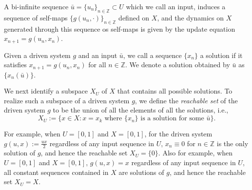 \documentclass[12 pt]{article}
\begin{document}
A bi-infinite sequence $\bar{u}=\{u_n\}_{n \in \mathbb{Z}} \subset U$ which we call an input, induces a sequence of self-maps $\{g(u_n,\cdot)\}_{n\in \mathbb{Z}}$ defined on $X$, and  the dynamics on $X$ generated through this sequence os self-maps is given by the  update equation $x_{n+1}=g(u_n,x_n)$. 


Given a driven system $g$ and an input $\bar{u}$, we call a sequence $\{x_n\}$ a solution if it satisfies  $x_{n+1}=g(u_n,x_n)$ for all $n\in \mathbb{Z}$. We denote a solution obtained by $\bar{u}$ as $\{x_n(\bar{u})\}$.

We next identify a subspace $X_U$ of $X$ that contains all possible solutions. To realize such a subspace of a driven system $g$, we define 
the \textit{reachable set} of the driven system $g$ to be the union of all the elements of all the solutions, i.e., 
$$X_U :=\Big \{x \in X:  x = x_k \mbox{ where  $\{x_n\}$  is a solution for some  $\bar{u}$} \Big \}.$$




For example, when $U=[0,1]$ and $X=[0,1]$, for the driven system 
$g(u,x) := \frac{ux}{2}$ regardless of any input sequence in $U$, $x_n\equiv 0$ for $n \in \mathbb{Z}$ is the only solution of $g$, and hence the reachable set $X_U=\{0\}$. Also for example, when  $U=[0,1]$ and $X=[0,1]$, $g(u,x)=x$ regardless of any input sequence in $U$, all constant sequences contained in $X$ are solutions of $g$, and hence the reachable set $X_U=X$. 
\end{document}
